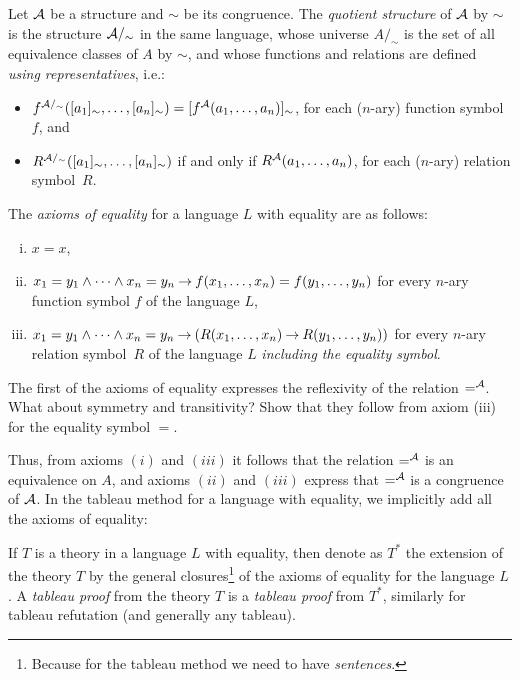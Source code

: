 \begin{definition}
    Let $\mathcal{A}$ be a structure and $\sim$ be its congruence. The \emph{quotient structure} of $\mathcal{A}$ by $\sim$ is the structure $\mathcal{A}/_\sim$ in the same language, whose universe $A/_\sim$ is the set of all equivalence classes of $A$ by $\sim$, and whose functions and relations are defined \emph{using representatives}, i.e.:
    \begin{itemize}
        \item $f^{\mathcal{A}/_\sim}([a_1]_\sim,\dots,[a_n]_\sim)=[f^{\mathcal{A}}(a_1,\dots,a_n)]_\sim$, for each ($n$-ary) function symbol $f$, and
        \item $R^{\mathcal{A}/_\sim}([a_1]_\sim,\dots,[a_n]_\sim)$ if and only if $R^{\mathcal{A}}(a_1,\dots,a_n)$, for each ($n$-ary) relation symbol~$R$.
    \end{itemize} 
    
\end{definition}


\begin{definition}
    The \emph{axioms of equality} for a language $L$ with equality are as follows:
    \begin{enumerate}[(i)]
        \item $x=x$,
        \item $x_1=y_1\land\cdots\land x_n=y_n\mathbin{\rightarrow} f(x_1,\dots,x_n)=f(y_1,\dots,y_n)$ for every $n$-ary function symbol $f$ of the language $L$,
        \item $x_1=y_1\land\cdots\land x_n=y_n\mathbin{\rightarrow} (R(x_1,\dots,x_n)\mathbin{\rightarrow} R(y_1,\dots,y_n))$ for every $n$-ary relation symbol~$R$ of the language $L$ \emph{including the equality symbol}.
    \end{enumerate}
\end{definition}

\begin{exercise}
    The first of the axioms of equality expresses the reflexivity of the relation $=^{\mathcal{A}}$. What about symmetry and transitivity? Show that they follow from axiom (iii) for the equality symbol $=$.
\end{exercise}

Thus, from axioms $(i)$ and $(iii)$ it follows that the relation $=^{\mathcal{A}}$ is an equivalence on $A$, and axioms $(ii)$ and $(iii)$ express that $=^{\mathcal{A}}$ is a congruence of $\mathcal{A}$. In the tableau method for a language with equality, we implicitly add all the axioms of equality:

\begin{definition}
    If $T$ is a theory in a language $L$ with equality, then denote as $T^*$ the extension of the theory $T$ by the general closures\footnote{Because for the tableau method we need to have \emph{sentences}.} of the axioms of equality for the language $L$. A \emph{tableau proof} from the theory $T$ is a \emph{tableau proof} from $T^*$, similarly for tableau refutation (and generally any tableau).    
\end{definition}

